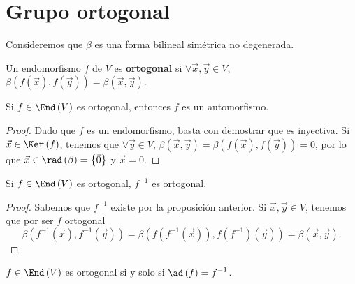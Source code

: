 \section{Grupo ortogonal}
Consideremos que $\displaystyle \beta  $ es una forma bilineal simétrica no degenerada.
\begin{fdefinition}[]
\normalfont Un endomorfismo $\displaystyle f $  de $\displaystyle V $ es \textbf{ortogonal} si $\displaystyle \forall \vec{x}, \vec{y} \in V $, $\displaystyle \beta\left(f\left(\vec{x}\right), f\left(\vec{y}\right)\right) = \beta\left(\vec{x}, \vec{y}\right) $.
\end{fdefinition}
\begin{fprop}[]
\normalfont Si $\displaystyle f \in \End\left(V\right) $ es ortogonal, entonces $\displaystyle f $ es un automorfismo.
\end{fprop}
\begin{proof}
	Dado que $\displaystyle f $ es un endomorfismo, basta con demostrar que es inyectiva. Si $\displaystyle \vec{x} \in \Ker\left(f\right) $, tenemos que $\displaystyle \forall \vec{y} \in V $, $\displaystyle \beta\left(\vec{x}, \vec{y}\right) =\beta\left(f\left(\vec{x}\right), f\left(\vec{y}\right)\right) = 0 $, por lo que $\displaystyle \vec{x} \in \rad\left(\beta \right) = \left\{ \vec{0}\right\}  $ y $\displaystyle \vec{x} = 0 $. 
\end{proof}
\begin{fprop}[]
\normalfont Si $\displaystyle f \in \End\left(V\right)$ es ortogonal, $\displaystyle f^{-1} $ es ortogonal.
\end{fprop}
\begin{proof}
Sabemos que $\displaystyle f^{-1} $ existe por la proposición anterior. Si $\displaystyle \vec{x}, \vec{y} \in V $, tenemos que por ser $\displaystyle f $ ortogonal 
\[ \beta\left(f^{-1}\left(\vec{x}\right), f^{-1}\left(\vec{y}\right)\right) = \beta\left(f\left(f^{-1}\left(\vec{x}\right)\right), f\left(f^{-1}\right)\left(\vec{y}\right)\right) = \beta\left(\vec{x}, \vec{y}\right).\]
\end{proof}
\begin{fprop}[]
\normalfont $\displaystyle f \in \End\left(V\right) $ es ortogonal si y solo si $\displaystyle \ad\left(f\right) = f^{-1} $.
\end{fprop}
